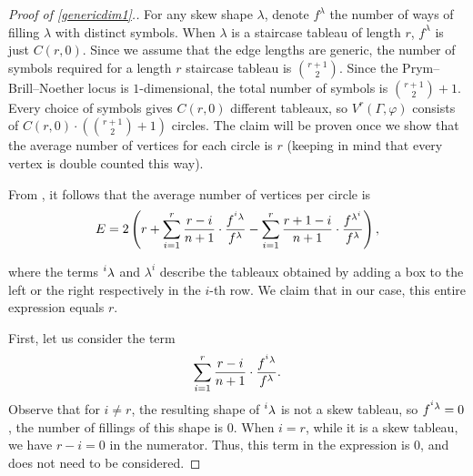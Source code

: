 \documentclass[11pt,reqno]{amsart}
\newcommand{\yoav}[1]{{\color{blue} \sf  Yo$\alpha$v: [#1]}}
\newcommand{\derek}[1]{{\color{Green} \sf D: [#1]}}
\theoremstyle{definition}
\theoremstyle{problem}
\theoremstyle{plain}
\theoremstyle{remark}
\theoremstyle{theorem}
\numberwithin{equation}{section}
\numberwithin{figure}{section}
\theoremstyle{definition}
\theoremstyle{problem}
\theoremstyle{plain}
\begin{document}
\begin{proof}[Proof of \cref{genericdim1}.]
	For any skew shape $\lambda$, denote $f^\lambda$ the number of ways of filling $\lambda$ with distinct symbols. When $\lambda$ is a staircase tableau of length $r$, $f^\lambda$ is just $C(r,0)$. Since we assume that the edge lengths are generic, the number of symbols required for a length $r$ staircase tableau is $\binom{r+1}{2}$. Since the Prym--Brill--Noether locus is $1$-dimensional, the total number of symbols is $\binom{r+1}{2}+1$. Every choice of symbols gives $C(r,0)$ different tableaux, so $V^r(\Gamma,\varphi)$ consists of $C(r,0) \cdot \left(\binom{r+1}{2}+1\right)$ circles. The claim will be proven once we show that the average number of vertices for each circle is $r$ (keeping in mind that every vertex is double counted this way).
	
	
	
	From \cite[Theorem~2.9]{chan2018genera}, it follows that the average number of vertices per circle is
	\begin{gather*}
		E= 2\left(r+\sum_{i=1}^{r}\frac{r-i}{n+1} \cdot
		\frac{f^{\prescript{i}{}{\lambda}}}{f^{\lambda}}-\sum_{i=1}^{r}\frac{r+1-i}{n+1} \cdot
		\frac{f^{\lambda^{i}}}{f^{\lambda}}\right),
	\end{gather*}
	
	where the terms $\prescript{i}{}{\lambda}$ and $\lambda^{i}$ describe the tableaux  obtained by adding a box to the left or the right respectively in the $i$-th row. We claim that in our case, this entire expression equals $r$.  
	
	First, let us consider the term 
	\begin{gather*}
		\sum_{i=1}^{r}\frac{r-i}{n+1} \cdot
		\frac{f^{\prescript{i}{}{\lambda}}}{f^{\lambda}}.
	\end{gather*}
	Observe that for $i\neq r$, the resulting shape of $\prescript{i}{}{\lambda}$ is not a skew tableau, so $f^{\prescript{i}{}{\lambda}}=0$, the number of fillings of this shape is $0$.  When $i=r$, while it is a skew tableau, we have $r-i=0$ in
	the numerator. Thus, this term in the expression is 0, and
	does not need to be considered.
	

\end{proof}
\end{document}
